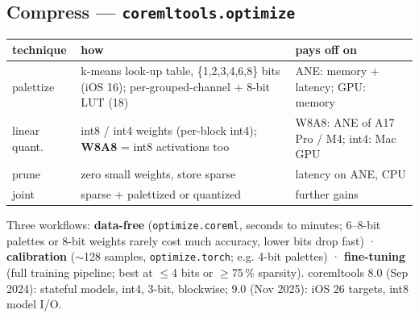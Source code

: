\documentclass[8pt]{extarticle}
\newcommand\ct[1]{\texttt{#1}}
\begin{document}
\begin{multicols}{2}
\section{Compress — \texttt{coremltools.optimize}}
{\scriptsize\setlength{\tabcolsep}{2.5pt}
\begin{tabular}{@{}L{13mm}L{38mm}L{25mm}@{}}
\toprule
\textbf{technique} & \textbf{how} & \textbf{pays off on}\\
\midrule
palettize & k-means look-up table, \{1,2,3,4,6,8\} bits (iOS 16); per-grouped-channel + 8-bit LUT (18) & ANE: memory + latency; GPU: memory\\
linear quant. & int8 / int4 weights (per-block int4); \textbf{W8A8} = int8 activations too & W8A8: ANE of A17 Pro / M4; int4: Mac GPU\\
prune & zero small weights, store sparse & latency on ANE, CPU\\
joint & sparse + palettized or quantized & further gains\\
\bottomrule
\end{tabular}}\par
Three workflows: \textbf{data-free} (\ct{optimize.coreml}, seconds to minutes; 6--8-bit palettes
or 8-bit weights rarely cost much accuracy, lower bits drop fast) · \textbf{calibration}
($\sim$128 samples, \ct{optimize.torch}; e.g. 4-bit palettes) · \textbf{fine-tuning} (full
training pipeline; best at $\le$4 bits or $\ge$75\,\% sparsity). coremltools 8.0 (Sep 2024):
stateful models, int4, 3-bit, blockwise; 9.0 (Nov 2025): iOS 26 targets, int8 model I/O.

\columnbreak


\end{multicols}
\end{document}
